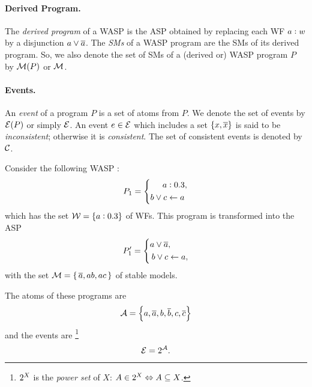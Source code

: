 \documentclass[x11names]{tlp}
\begin{document}
\paragraph{Derived Program.}

The \emph{derived program} of a \ac{WASP} is the \ac{ASP} obtained by replacing each \acl{WF} $a:w$ by a disjunction $a \vee \overline{a}$.
The \textit{\aclp{SM}} of a \acs{WASP} program are the \aclp{SM} of its derived program.
So, we also denote the set of \acp{SM} of a (derived or) \acs{WASP} program $P$ by $\MODELset\at{P}$ or ${\mathcal{M}}$.

\paragraph{Events.}

An \emph{event} of a program $P$ is a set of atoms from $P$.
We denote the set of events by
$\EVENTSset\at{P}$ or simply ${\mathcal{E}}$.
An event $e \in {\mathcal{E}}$ which includes a set $\set{x, \ensuremath{\overline{x}}}$ is said to be \textit{inconsistent}; otherwise it is \textit{consistent}.
The set of consistent events is denoted by ${\mathcal{C}}$.

\begin{example}
	\label{ex:fruitful}\em

	Consider the following \acl{WASP} :
	\begin{equation}\label{eq:fruitful}
		\SBF = \left\{\begin{split}
			\weightfact{a & }{0.3},   %
			\\
			b \vee c    & \clause a
		\end{split}
		\right.
	\end{equation}
	which has the set ${\mathcal{W}} = \{ a:0.3 \}$ of \aclp{WF}.
This program is transformed into the \acl{ASP}
	\begin{equation}\label{eq:derived.fruitful}
		\SBF' = \left\{\begin{split}
			a \vee \co{a} & ,          %
			\\
			b \vee c      & \clause a,
		\end{split}
		\right.
	\end{equation}
	with the set
	$ {\mathcal{M}} = \{\, \overline{a}, ab, ac\, \} $
	of stable models.

The atoms of these programs are 
\begin{equation}
	{\mathcal{A}} = \set{a, \ensuremath{\overline{a}}, b, \ensuremath{\overline{b}}, c, \ensuremath{\overline{c}}}
	\label{eq:atoms.fruitful}
\end{equation}
and the events are%
\footnote{$\mathrm{2}^{X}$ is the \emph{power set} of $X$: $A \in \mathrm{2}^{X} \Leftrightarrow A \subseteq X$.} 
\begin{equation}
	{\mathcal{E}} = \mathrm{2}^{{\mathcal{A}}}.
	\label{eq:fruitful.events}
\end{equation}
\end{example}
\end{document}
